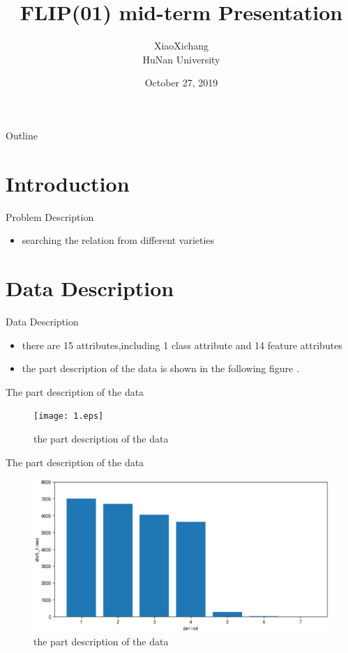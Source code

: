 \documentclass[
 size=14pt,
 paper=smartboard, %
 mode=present, %
 display=slides, %
style=tuliplab,
pauseslide,
fleqn,leqno]{powerdot}
\title{FLIP(01) mid-term Presentation}
\author{
XiaoXichang
\\
HuNan University 
}
\date{October 27, 2019}
\begin{document}
\maketitle 

\begin{slide}[toc=,bm=]{Outline}
\tableofcontents[content=sections]
\end{slide}

\section{Introduction}

\begin{slide}{Problem Description}
  \begin{itemize}
    \item  searching the relation from different varieties 
  \end{itemize}
\end{slide}


\section{Data Description}


\begin{slide}{Data Description}
\begin{itemize}
\item there are 15 attributes,including 1 class attribute and 14 feature attributes
\item the part description of the data is shown in the following figure .
\end{itemize}
\end{slide}

\begin{slide}{The part description of the data}
	\vspace*{10pt}
	\begin{figure}[htbp]
		\centering
		\texttt{[image: 1.eps]}
		\caption{the part description of the data}
	\end{figure}
\end{slide}


\begin{slide}{The part description of the data}
	\vspace*{10pt}
	\begin{figure}[htbp]
		\centering
		\includegraphics[scale=0.4]{o.eps}
		\caption{the part description of the data}
	\end{figure}
\end{slide}
\end{document}
